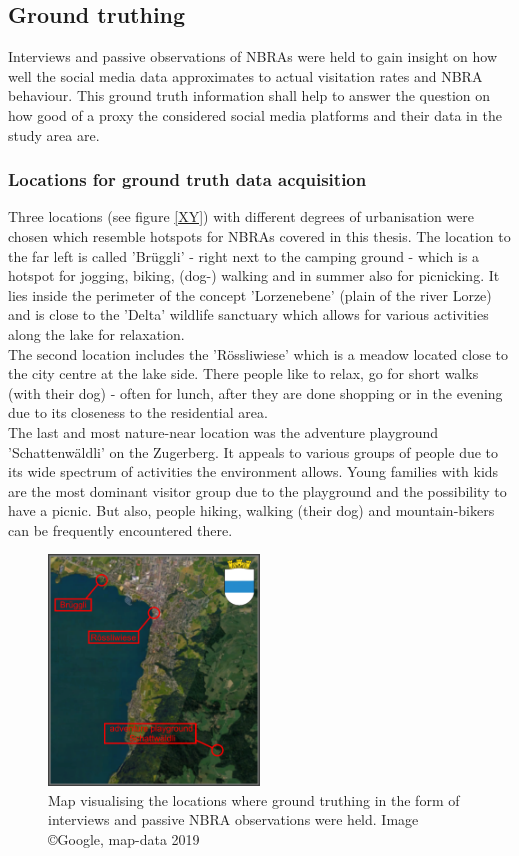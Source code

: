 \subsection{Ground truthing} \label{groud_truthing}
Interviews and passive observations of NBRAs were held to gain insight on how well the social media data approximates to actual visitation rates and NBRA behaviour. This ground truth information shall help to answer the question on how good of a proxy the considered social media platforms and their data in the study area are.
\subsubsection{Locations for ground truth data acquisition} \label{locations_ground_truthing_data}
Three locations (see figure \ref{XY}) with different degrees of urbanisation were chosen which resemble hotspots for NBRAs covered in this thesis. The location to the far left is called 'Br\"uggli' - right next to the camping ground - which is a hotspot for jogging, biking, (dog-) walking and in summer also for picnicking. It lies inside the perimeter of the concept 'Lorzenebene' (plain of the river Lorze) and is close to the 'Delta' wildlife sanctuary which allows for various activities along the lake for relaxation.\\
The second location includes the 'R\"ossliwiese' which is a meadow located close to the city centre at the lake side. There people like to relax, go for short walks (with their dog) - often for lunch, after they are done shopping or in the evening due to its closeness to the residential area.\\
The last and most nature-near location was the adventure playground 'Schattenw\"aldli' on the Zugerberg. It appeals to various groups of people due to its wide spectrum of activities the environment allows. Young families with kids are the most dominant visitor group due to the playground and the possibility to have a picnic. But also, people hiking, walking (their dog) and mountain-bikers can be frequently encountered there.

\begin{figure}[h]
       \centering
       \includegraphics[width=0.5\textwidth, left]{img/interviews_locations}
       \caption{Map visualising the locations where ground truthing in the form of interviews and passive NBRA observations were held. Image \copyright Google, map-data 2019}
       \label{fig:locations_ground_truthing}
\end{figure}

